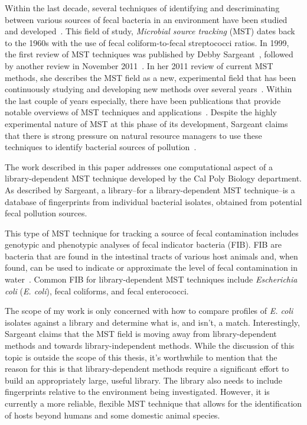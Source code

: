 \documentclass[12pt]{ucthesis}
\begin{document}
   Within the last decade, several techniques of identifying and descriminating
   between various sources of fecal bacteria in an environment have been studied and
   developed~\cite{Sargeant:ReviewMST, Hagedorn:MST_TMDL, Lowe:FocusMST,
   Rivera:MSTCharacterization, Cornelison:MSTTools, Chase:FloridaMST}. This
   field of study, \textit{Microbial source tracking} (MST) dates back to the
   1960s with the use of fecal coliform-to-fecal streptococci ratios. In 1999,
   the first review of MST techniques was published by Debby
   Sargeant~\cite{Sargeant:Methods}, followed by another review in November
   2011~\cite{Sargeant:ReviewMST}. In her 2011
   review of current MST methods, she describes the MST field as a new,
   experimental field that has been continuously studying and developing new
   methods over several years~\cite{Sargeant:ReviewMST}. Within the last couple
   of years especially, there have been publications that provide notable
   overviews of MST techniques and applications~\cite{Hagedorn:CaseStudies,
   Domingo:Current, Harwood:RapidMethods}. Despite the highly experimental
   nature of MST at this phase of its development, Sargeant claims that there
   is strong pressure on natural resource managers to use these techniques to
   identify bacterial sources of pollution~\cite{Sargeant:ReviewMST}.

   The work described in this paper addresses one computational aspect of a
   library-dependent MST technique developed by the Cal Poly Biology
   department. As described by Sargeant, a library--for a library-dependent MST
   technique--is a database of fingerprints from individual bacterial isolates,
   obtained from potential fecal pollution sources.
   
   This type of MST technique
   for tracking a source of fecal contamination includes genotypic and
   phenotypic analyses of fecal indicator bacteria (FIB). FIB are bacteria that
   are found in the intestinal tracts of various host animals and, when found,
   can be used to indicate or approximate the level of fecal contamination in
   water~\cite{Simpson:StateOf}. Common FIB for library-dependent MST
   techniques include \textit{Escherichia coli} (\textit{E. coli}), fecal
   coliforms, and fecal enterococci.

   The scope of my work is only concerned with how to compare profiles of
   \textit{E. coli} isolates against a library and determine what is, and
   isn't, a match. Interestingly, Sargeant claims that the MST field is moving
   away from library-dependent methods and towards library-independent methods.
   While the discussion of this topic is outside the scope of this thesis, it's
   worthwhile to mention that the reason for this is that library-dependent
   methods require a significant effort to build an appropriately large, useful
   library. The library also needs to include fingerprints relative to the
   environment being investigated. However, it is currently a more reliable,
   flexible MST technique that allows for the identification of hosts beyond
   humans and some domestic animal species.
   
\end{document}
